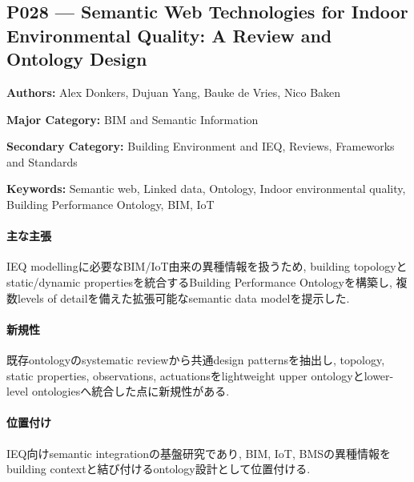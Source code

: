 \subsection{P028 --- Semantic Web Technologies for Indoor Environmental Quality: A Review and Ontology Design}
\label{paper:P028}
\textbf{Authors:} Alex Donkers, Dujuan Yang, Bauke de Vries, Nico Baken\par
\textbf{Major Category:} BIM and Semantic Information\par
\textbf{Secondary Category:} Building Environment and IEQ, Reviews, Frameworks and Standards\par
\textbf{Keywords:} Semantic web, Linked data, Ontology, Indoor environmental quality, Building Performance Ontology, BIM, IoT\par
\paragraph{主な主張}
IEQ modellingに必要なBIM/IoT由来の異種情報を扱うため, building topologyとstatic/dynamic propertiesを統合するBuilding Performance Ontologyを構築し, 複数levels of detailを備えた拡張可能なsemantic data modelを提示した. \cite{Donkers:2022BOPIEQ}
\paragraph{新規性}
既存ontologyのsystematic reviewから共通design patternsを抽出し, topology, static properties, observations, actuationsをlightweight upper ontologyとlower-level ontologiesへ統合した点に新規性がある.
\paragraph{位置付け}
IEQ向けsemantic integrationの基盤研究であり, BIM, IoT, BMSの異種情報をbuilding contextと結び付けるontology設計として位置付ける.
